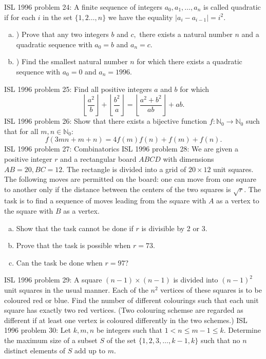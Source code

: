 ISL 1996 problem 24:  A finite sequence of integers $ a_0, a_1, \ldots, a_n$ is called quadratic if for each $ i$ in the set $ \{1,2 \ldots, n\}$ we have the equality $ |a_i - a_{i-1}| = i^2.$
\begin{enumerate}[a.]
  \item ) Prove that any two integers $ b$ and $ c,$ there exists a natural number $ n$ and a quadratic sequence with $ a_0 = b$ and $ a_n = c.$
  \item ) Find the smallest natural number $ n$ for which there exists a quadratic sequence with  $ a_0 = 0$ and $ a_n = 1996.$
\end{enumerate} 
ISL 1996 problem 25:  Find all positive integers $ a$ and $ b$ for which
\[
\left \lfloor \frac{a^2}{b} \right \rfloor + \left \lfloor \frac{b^2}{a} \right \rfloor = \left \lfloor \frac{a^2 + b^2}{ab} \right \rfloor + ab.
\] 
ISL 1996 problem 26:  Show that there exists a bijective function $ f: \mathbb{N}_0\to \mathbb{N}_0$ such that for all $ m,n\in \mathbb{N}_0$:
\[ f(3mn + m + n) = 4f(m)f(n) + f(m) + f(n). \] 
ISL 1996 problem 27:  Combinatorics 
ISL 1996 problem 28:  We are given a positive integer $ r$ and a rectangular board $ ABCD$ with dimensions $ AB = 20, BC = 12$. The rectangle is divided into a grid of $ 20 \times 12$ unit squares. The following moves are permitted on the board: one can move from one square to another only if the distance between the centers of the two squares is $ \sqrt {r}$. The task is to find a sequence of moves leading from the square with $ A$ as a vertex to the square with $ B$ as a vertex.
\begin{enumerate}[(a)]
  \item Show that the task cannot be done if $ r$ is divisible by 2 or 3.
  \item Prove that the task is possible when $ r = 73$.
  \item Can the task be done when $ r = 97$?
\end{enumerate} 
ISL 1996 problem 29:  A square $ (n - 1) \times (n - 1)$ is divided into $ (n - 1)^2$ unit squares in the usual manner. Each of the $ n^2$ vertices of these squares is to be coloured red or blue. Find the number of different colourings such that each unit square has exactly two red vertices. (Two colouring schemse are regarded as different if at least one vertex is coloured differently in the two schemes.) 
ISL 1996 problem 30:  Let $ k,m,n$ be integers such that $ 1 < n \leq m - 1 \leq k.$ Determine the maximum size of a subset $ S$ of the set $ \{1,2,3, \ldots, k-1,k\}$ such that no $ n$ distinct elements of $ S$ add up to $ m.$ 
